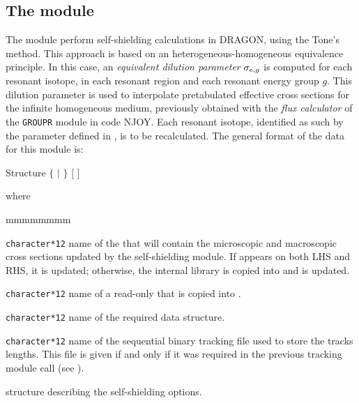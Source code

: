 \subsection{The  module}\label{sect:TONEData}

The  module perform self-shielding calculations in DRAGON, using
the Tone's method.\cite{tone}  This approach is based on an heterogeneous-homogeneous equivalence principle. In this case, an {\sl equivalent dilution parameter} $\sigma_{{\rm e},g}$ is computed for each resonant isotope, in each resonant region and
each resonant energy group $g$. This dilution parameter is used to interpolate pretabulated effective cross sections for the infinite homogeneous medium, previously obtained with the {\sl flux calculator} of the {\tt GROUPR} module in code NJOY.\cite{njoy2010}
Each resonant isotope, identified as such by the 
parameter defined in , is to be recalculated. The general format of
the data for this module is:

\begin{DataStructure}{Structure }
 \moc{:=}  $\{$  $|$  $\}$ 
 $[$  $]$ \moc{::} 
\end{DataStructure}

\noindent where

\begin{ListeDeDescription}{mmmmmmmm}

\item[\dusa{MICLIB}] {\tt character*12} name of the  that will
contain the microscopic and macroscopic cross sections updated by the
self-shielding module. If
 appears on both LHS and RHS, it is updated; otherwise, the
internal library  is copied into
 and  is updated.

\item[\dusa{OLDLIB}] {\tt character*12} name of a read-only  
that is copied into .

\item[\dusa{TRKNAM}] {\tt character*12} name of the required 
data structure.

\item[\dusa{TRKFIL}] {\tt character*12} name of the sequential binary tracking
file used to store the tracks lengths. This file is given if and only if it was
required in the previous tracking module call (see ).

\item[\dstr{desctone}] structure describing the self-shielding options.

\end{ListeDeDescription}

